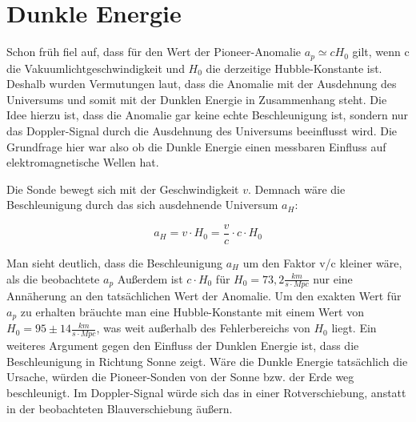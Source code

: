 \section{Dunkle Energie}\label{De}



Schon fr\"uh fiel auf, dass f\"ur den Wert der Pioneer-Anomalie
$a_{p}\simeq \mathit{cH}_{0}$ gilt, wenn c die
Vakuumlichtgeschwindigkeit und $H_0$ die
derzeitige Hubble-Konstante ist. Deshalb wurden Vermutungen
laut, dass die Anomalie mit der Ausdehnung des Universums und somit mit
der Dunklen Energie in Zusammenhang steht\cite{Turyshev2010}. Die Idee hierzu ist,
dass die Anomalie gar keine echte Beschleunigung ist, sondern nur das
Doppler-Signal durch die Ausdehnung des Universums beeinflusst wird.
Die Grundfrage hier war also ob die Dunkle Energie einen messbaren
Einfluss auf elektromagnetische Wellen hat.



Die Sonde bewegt sich mit der Geschwindigkeit $v$. Demnach w\"are
die Beschleunigung durch das sich ausdehnende Universum $a_H$:

\begin{equation*}
a_{H}=v\cdot H_{0}=\frac{v}{c}\cdot c\cdot H_{0}
\end{equation*}

Man sieht deutlich, dass die Beschleunigung
$a_H$ um den Faktor v/c kleiner w\"are,
als die beobachtete $a_p$
Au{\ss}erdem ist $c\cdot H_{0}$ f\"ur
$H_{0}=73,2\frac{\mathit{km}}{s\cdot \mathit{Mpc}}$ nur eine
Ann\"aherung an den tats\"achlichen Wert der Anomalie. Um den exakten
Wert f\"ur $a_p$ zu erhalten br\"auchte
man eine Hubble-Konstante mit einem Wert von $H_{0}=95\pm
14\frac{\mathit{km}}{s\cdot \mathit{Mpc}}$, was weit außerhalb des Fehlerbereichs von $H_0$ liegt. Ein weiteres
Argument gegen den Einfluss der Dunklen Energie ist, dass die
Beschleunigung in Richtung Sonne zeigt. W\"are die Dunkle Energie
tats\"achlich die Ursache, w\"urden die Pioneer-Sonden von der Sonne
bzw. der Erde weg beschleunigt. Im Doppler-Signal w\"urde sich das in
einer Rotverschiebung, anstatt in der beobachteten
Blauverschiebung \"au{\ss}ern.


